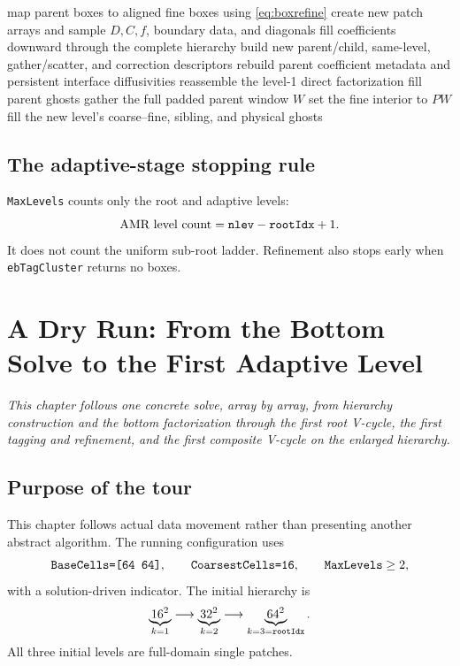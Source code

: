 \documentclass[11pt,oneside,openany]{book}
\newcommand{\code}[1]{\textnormal{\texttt{#1}}}
\begin{document}
\begin{algorithm}[htbp]
\caption{Adding one adaptive level, \code{ebAddLevel}}
\label{alg:addlevel}
\begin{algorithmic}[1]
\State map parent boxes to aligned fine boxes using \cref{eq:boxrefine}
\State create new patch arrays and sample $D,C,f$, boundary data, and diagonals
\State fill coefficients downward through the complete hierarchy
\State build new parent/child, same-level, gather/scatter, and correction descriptors
\State rebuild parent coefficient metadata and persistent interface diffusivities
\State reassemble the level-1 direct factorization
\State fill parent ghosts
  \State gather the full padded parent window $W$
  \State set the fine interior to $PW$
\EndFor
\State fill the new level's coarse--fine, sibling, and physical ghosts
\end{algorithmic}
\end{algorithm}

\section{The adaptive-stage stopping rule}
\code{MaxLevels} counts only the root and adaptive levels:
\[
  \text{AMR level count}=\code{nlev}-\code{rootIdx}+1.
\]
It does not count the uniform sub-root ladder. Refinement also stops early when \code{ebTagCluster} returns no boxes.

\chapter{A Dry Run: From the Bottom Solve to the First Adaptive Level}
\label{chap:dryrun}

\emph{This chapter follows one concrete solve, array by array, from hierarchy construction and the bottom factorization through the first root V-cycle, the first tagging and refinement, and the first composite V-cycle on the enlarged hierarchy.}

\section{Purpose of the tour}
This chapter follows actual data movement rather than presenting another abstract algorithm. The running configuration uses
\[
 \code{BaseCells=[64 64]},\qquad
 \code{CoarsestCells=16},\qquad
 \code{MaxLevels}\ge2,
\]
with a solution-driven indicator. The initial hierarchy is
\[
 \underbrace{16^2}_{k=1}
 \longrightarrow
 \underbrace{32^2}_{k=2}
 \longrightarrow
 \underbrace{64^2}_{k=3=\code{rootIdx}}.
\]
All three initial levels are full-domain single patches.
\end{document}
